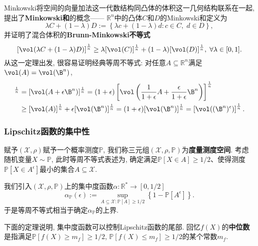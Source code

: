 Minkowski将空间的向量加法这一代数结构同凸体的体积这一几何结构联系在一起, 提出了\textbf{Minkowski和}的概念——
$\mathbb{R}^n$中的凸体$C$和$D$的Minkowski和定义为
\begin{equation*}
	\lambda C + (1 - \lambda) D := \left\{ \lambda c + (1 - \lambda) d \colon c \in C,\; d \in D \right\}, 
\end{equation*}
并证明了混合体积的\textbf{Brunn-Minkowski不等式}
\begin{equation*}
	\left[ \vol(\lambda C + (1-\lambda) D)  \right]^{\frac1n}
	\geq \lambda [\vol(C)]^{\frac1n} + (1-\lambda) [\vol(D)]^{\frac1n},\;
	\forall \lambda \in [0,1]. 
\end{equation*}
从这一定理出发, 很容易证明经典等周不等式: 对任意$A \subseteq \mathbb{R}^n$满足$\vol(A) = \vol(\B^n)$, 
\begin{align*}
	[\vol(A^{\epsilon})]^{\frac1n}
	&= [\vol(A + \epsilon \B^n)]^{\frac1n}
	= (1+\epsilon) \left[\vol\left(\frac{1}{1+\epsilon} A + \frac{\epsilon}{1+\epsilon} \B^n\right)\right]^{\frac1n} \\
	&\geq [\vol(A)]^{\frac1n} + \epsilon [\vol(\B^n)]^{\frac1n} 
	= (1+\epsilon) [\vol(\B^n)]^{\frac1n} 
	= \left[ \vol((\B^n)^{\epsilon}) \right]^{\frac1n}. 
\end{align*}

\subsubsection{Lipschitz函数的集中性}

赋予$(\mathcal{X}, \rho)$赋予一个概率测度$\mathbb{P}$, 我们称三元组$(\mathcal{X}, \rho, \mathbb{P})$为\textbf{度量测度空间}. 
考虑随机变量$X \sim \mathbb{P}$,  此时等周不等式表述为, 确定满足$\mathbb{P}[X \in A] \geq 1/2$、使得测度$\mathbb{P}[X \in A^{\epsilon}]$最小的集合$A \subseteq \mathcal{X}$.

我们引入$(\mathcal{X}, \rho, \mathbb{P})$上的集中度函数$\alpha \colon \mathbb{R}^* \to [0, 1/2]$
\begin{equation*}
	\alpha_{\mathbb{P}}(\epsilon)
	:= \sup_{A \subseteq \mathcal{X} \colon \mathbb{P}[A] \geq 1/2} \left\{ 1 - \mathbb{P}[A^{\epsilon}] \right\}. 
\end{equation*}
于是等周不等式相当于确定$\alpha_{\mathbb{P}}$的上界. 

下面的定理说明, 集中度函数可以控制Lipschitz函数的尾部. 
回忆$f(X)$的\textbf{中位数}是指满足$\mathbb{P}[f(X) \geq m_f] \geq 1/2$, $\mathbb{P}[f(X) \leq m_f] \geq 1/2$的某个常数$m_f$. 

